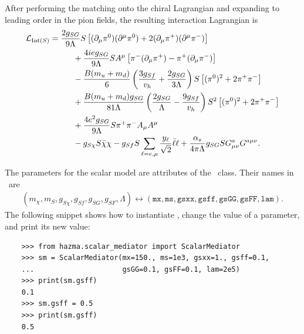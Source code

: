 After performing the matching onto the chiral Lagrangian and expanding to leading order in the pion fields, the resulting interaction Lagrangian is
\begin{align}
    \mathcal{L}_{\mathrm{Int}(S)} & = \frac{2 g_{SG}}{9 \Lambda} S \left[ (\partial_\mu \pi^0) (\partial^\mu \pi^0) + 2 (\partial_\mu \pi^+) (\partial^\mu \pi^-) \right]                                                                        \\
                         & \hspace{1cm} + \frac{4 i e g_{SG}}{9 \Lambda} S A^\mu \left[ \pi^- (\partial_\mu \pi^+) - \pi^+ (\partial_\mu \pi^-) \right]                                                                     \\
                         & \hspace{1cm} - \frac{B (m_u + m_d)}{6} \left( \frac{3 g_{Sf}}{v_h} + \frac{2 g_{SG}}{3 \Lambda} \right) S \left[ (\pi^0)^2 + 2 \pi^+ \pi^- \right]                                   \\
                         & \hspace{1cm} + \frac{B (m_u + m_d) g_{SG}}{81 \Lambda} \left( \frac{2 g_{SG}}{\Lambda} - \frac{9 g_{Sf}}{v_h} \right) S^2 \left[ (\pi^0)^2 + 2 \pi^+ \pi^- \right]                   \\
                         & \hspace{1cm} + \frac{4 e^2 g_{SG}}{9\Lambda} S \pi^+ \pi^- A_\mu A^\mu                                                                                                               \\
                         & \hspace{1cm} - g_{S \chi} S \bar{\chi} \chi - g_{Sf} S \sum_{\ell=e,\mu} \frac{y_\ell}{\sqrt{2}} \bar{\ell} \ell + \frac{\alpha_s}{4\pi \Lambda} g_{SG} S G_{\mu\nu}^a G^{a \mu\nu}.
\end{align}

The parameters for the scalar model are attributes of the \sm\ class. Their names in \hazma\ are
\begin{align*}
    (m_\chi, m_S, g_{S\chi}, g_{Sf}, g_{SG}, g_{SF}, \Lambda) \leftrightarrow (\mathtt{mx}, \mathtt{ms}, \mathtt{gsxx}, \mathtt{gsff}, \mathtt{gsGG}, \mathtt{gsFF}, \mathtt{lam}).
\end{align*}
The following snippet shows how to instantiate \sm, change the value of a parameter, and print its new value:
\begin{verbatim}
    >>> from hazma.scalar_mediator import ScalarMediator
    >>> sm = ScalarMediator(mx=150., ms=1e3, gsxx=1., gsff=0.1,
    ...                     gsGG=0.1, gsFF=0.1, lam=2e5)
    >>> print(sm.gsff)
    0.1
    >>> sm.gsff = 0.5
    >>> print(sm.gsff)
    0.5
\end{verbatim}

